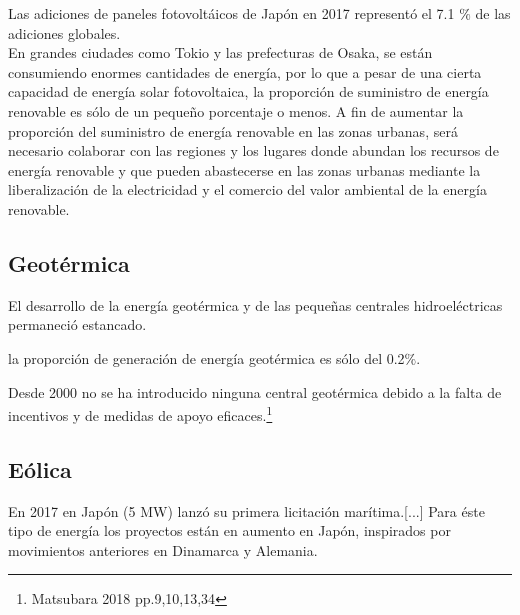 \documentclass[]{article}
\begin{document}
Las adiciones de paneles fotovoltáicos de Japón en 2017 representó el 7.1 $\%$ de las adiciones globales.\citep{Renewables2017globalstatusreport2017}\\

En grandes ciudades como Tokio y las prefecturas de Osaka, se están consumiendo enormes cantidades de energía, por lo que a pesar de una cierta capacidad de energía solar fotovoltaica, la proporción de suministro de energía renovable es sólo de un pequeño porcentaje o menos. A fin de aumentar la proporción del suministro de energía renovable en las zonas urbanas, será necesario colaborar con las regiones y los lugares donde abundan los recursos de energía renovable y que pueden abastecerse en las zonas urbanas mediante la liberalización de la electricidad y el comercio del valor ambiental de la energía renovable.\cite{Matsubara2018}\\

\subsection{Geotérmica}

El desarrollo de la energía geotérmica y de las pequeñas centrales hidroeléctricas permaneció estancado.


la proporción de generación de energía geotérmica es sólo del 0.2$\%$.

Desde 2000 no se ha introducido ninguna central geotérmica debido a la falta de incentivos y de medidas de apoyo eficaces.\citep{Matsubara2018}\footnote{Matsubara 2018 pp.9,10,13,34}\\

\subsection{Eólica}

En 2017 en Japón (5 MW) lanzó su primera licitación marítima.[...] Para éste tipo de energía los proyectos están en aumento en Japón, inspirados por movimientos anteriores en Dinamarca y Alemania.\\
\end{document}
